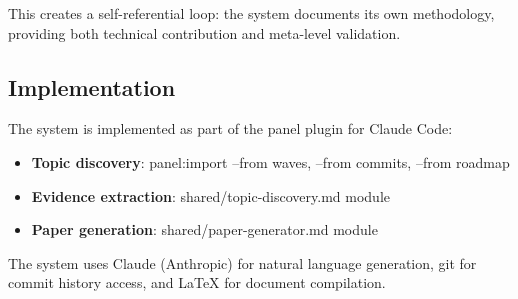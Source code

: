 This creates a self-referential loop: the system documents its own methodology, providing both technical contribution and meta-level validation.

\subsection{Implementation}

The system is implemented as part of the panel plugin for Claude Code:

\begin{itemize}
\item \textbf{Topic discovery}: panel:import --from waves, --from commits, --from roadmap
\item \textbf{Evidence extraction}: shared/topic-discovery.md module
\item \textbf{Paper generation}: shared/paper-generator.md module
\end{itemize}

The system uses Claude (Anthropic) for natural language generation, git for commit history access, and LaTeX for document compilation.
